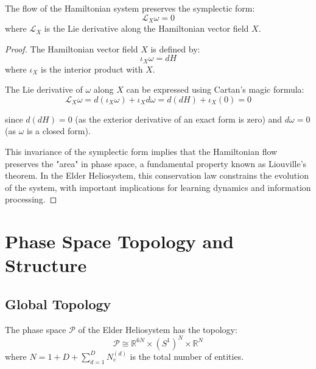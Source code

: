 \begin{theorem}
The flow of the Hamiltonian system preserves the symplectic form:
\begin{equation}
\mathcal{L}_X \omega = 0
\end{equation}
where $\mathcal{L}_X$ is the Lie derivative along the Hamiltonian vector field $X$.
\end{theorem}

\begin{proof}
The Hamiltonian vector field $X$ is defined by:
\begin{equation}
\iota_X \omega = dH
\end{equation}
where $\iota_X$ is the interior product with $X$.

The Lie derivative of $\omega$ along $X$ can be expressed using Cartan's magic formula:
\begin{equation}
\mathcal{L}_X \omega = d(\iota_X \omega) + \iota_X d\omega = d(dH) + \iota_X(0) = 0
\end{equation}

since $d(dH) = 0$ (as the exterior derivative of an exact form is zero) and $d\omega = 0$ (as $\omega$ is a closed form).

This invariance of the symplectic form implies that the Hamiltonian flow preserves the "area" in phase space, a fundamental property known as Liouville's theorem. In the Elder Heliosystem, this conservation law constrains the evolution of the system, with important implications for learning dynamics and information processing.
\end{proof}

\section{Phase Space Topology and Structure}

\subsection{Global Topology}

\begin{theorem}
The phase space $\mathcal{P}$ of the Elder Heliosystem has the topology:
\begin{equation}
\mathcal{P} \cong \mathbb{R}^{6N} \times (S^1)^N \times \mathbb{R}^N
\end{equation}
where $N = 1 + D + \sum_{d=1}^D N_e^{(d)}$ is the total number of entities.
\end{theorem}

